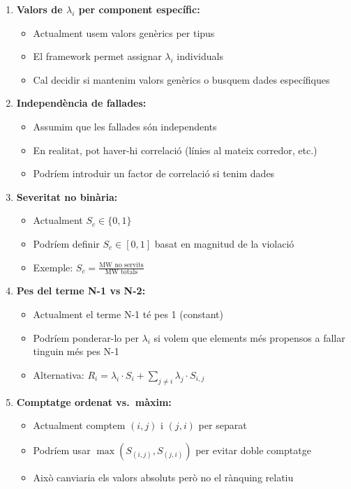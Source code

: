 \documentclass[11pt,a4paper]{article}
\begin{document}
\begin{enumerate}
    \item \textbf{Valors de $\lambda_i$ per component específic:}
    \begin{itemize}
        \item Actualment usem valors genèrics per tipus
        \item El framework permet assignar $\lambda_i$ individuals
        \item Cal decidir si mantenim valors genèrics o busquem dades específiques
    \end{itemize}
    
    \item \textbf{Independència de fallades:}
    \begin{itemize}
        \item Assumim que les fallades són independents
        \item En realitat, pot haver-hi correlació (línies al mateix corredor, etc.)
        \item Podríem introduir un factor de correlació si tenim dades
    \end{itemize}
    
    \item \textbf{Severitat no binària:}
    \begin{itemize}
        \item Actualment $S_c \in \{0, 1\}$
        \item Podríem definir $S_c \in [0, 1]$ basat en magnitud de la violació
        \item Exemple: $S_c = \frac{\text{MW no servits}}{\text{MW totals}}$
    \end{itemize}
    
    \item \textbf{Pes del terme N-1 vs N-2:}
    \begin{itemize}
        \item Actualment el terme N-1 té pes 1 (constant)
        \item Podríem ponderar-lo per $\lambda_i$ si volem que elements més propensos a fallar tinguin més pes N-1
        \item Alternativa: $R_i = \lambda_i \cdot S_i + \sum_{j \neq i} \lambda_j \cdot S_{i,j}$
    \end{itemize}
    
    \item \textbf{Comptatge ordenat vs.\ màxim:}
    \begin{itemize}
        \item Actualment comptem $(i,j)$ i $(j,i)$ per separat
        \item Podríem usar $\max(S_{(i,j)}, S_{(j,i)})$ per evitar doble comptatge
        \item Això canviaria els valors absoluts però no el rànquing relatiu
    \end{itemize}
\end{enumerate}
\end{document}
